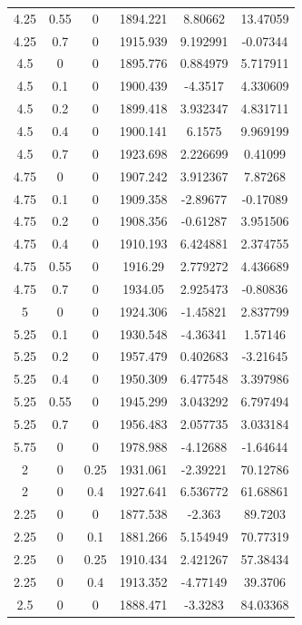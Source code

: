 \begin{longtable}{|c|c|c|c|c|c|}
	4.25  & 0.55  & 0     & 1894.221 & 8.80662 & 13.47059 \\
	4.25  & 0.7   & 0     & 1915.939 & 9.192991 & -0.07344 \\
	4.5   & 0     & 0     & 1895.776 & 0.884979 & 5.717911 \\
	4.5   & 0.1   & 0     & 1900.439 & -4.3517 & 4.330609 \\
	4.5   & 0.2   & 0     & 1899.418 & 3.932347 & 4.831711 \\
	4.5   & 0.4   & 0     & 1900.141 & 6.1575 & 9.969199 \\
	4.5   & 0.7   & 0     & 1923.698 & 2.226699 & 0.41099 \\
	4.75  & 0     & 0     & 1907.242 & 3.912367 & 7.87268 \\
	4.75  & 0.1   & 0     & 1909.358 & -2.89677 & -0.17089 \\
	4.75  & 0.2   & 0     & 1908.356 & -0.61287 & 3.951506 \\
	4.75  & 0.4   & 0     & 1910.193 & 6.424881 & 2.374755 \\
	4.75  & 0.55  & 0     & 1916.29 & 2.779272 & 4.436689 \\
	4.75  & 0.7   & 0     & 1934.05 & 2.925473 & -0.80836 \\
	5     & 0     & 0     & 1924.306 & -1.45821 & 2.837799 \\
	5.25  & 0.1   & 0     & 1930.548 & -4.36341 & 1.57146 \\
	5.25  & 0.2   & 0     & 1957.479 & 0.402683 & -3.21645 \\
	5.25  & 0.4   & 0     & 1950.309 & 6.477548 & 3.397986 \\
	5.25  & 0.55  & 0     & 1945.299 & 3.043292 & 6.797494 \\
	5.25  & 0.7   & 0     & 1956.483 & 2.057735 & 3.033184 \\
	5.75  & 0     & 0     & 1978.988 & -4.12688 & -1.64644 \\
	2     & 0     & 0.25  & 1931.061 & -2.39221 & 70.12786 \\
	2     & 0     & 0.4   & 1927.641 & 6.536772 & 61.68861 \\
	2.25  & 0     & 0     & 1877.538 & -2.363 & 89.7203 \\
	2.25  & 0     & 0.1   & 1881.266 & 5.154949 & 70.77319 \\
	2.25  & 0     & 0.25  & 1910.434 & 2.421267 & 57.38434 \\
	2.25  & 0     & 0.4   & 1913.352 & -4.77149 & 39.3706 \\
	2.5   & 0     & 0     & 1888.471 & -3.3283 & 84.03368 \\

\end{longtable}
